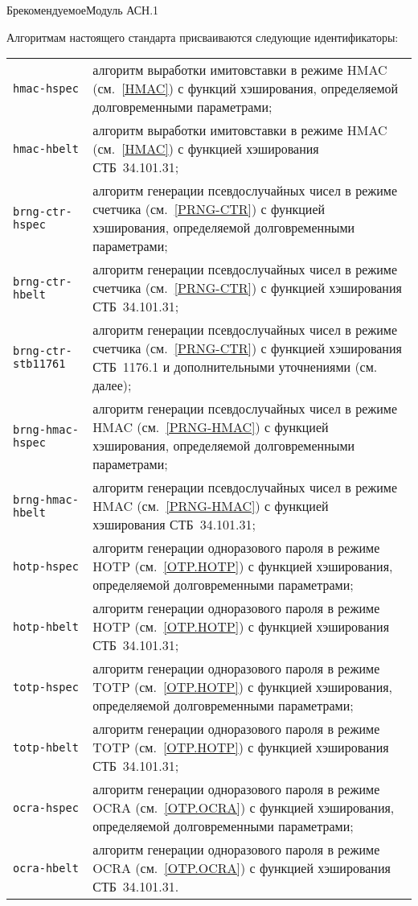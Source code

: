 \begin{appendix}{Б}{рекомендуемое}{Модуль АСН.1}
\label{ASN}


Алгоритмам настоящего стандарта присваиваются следующие идентификаторы:
\begin{center}
\begin{tabular}{p{4cm}p{12cm}}
\texttt{hmac-hspec} & 
алгоритм выработки имитовставки в режиме HMAC (см.~\ref{HMAC})
с функций хэширования, определяемой долговременными параметрами;\\ 
%
\texttt{hmac-hbelt} & 
алгоритм выработки имитовставки в режиме HMAC (см.~\ref{HMAC})
с функцией хэширования СТБ~34.101.31;\\ 
%
\texttt{brng-ctr-hspec} & 
алгоритм генерации псевдослучайных чисел в режиме счетчика 
(см.~\ref{PRNG-CTR})
с функцией хэширования, определяемой долговременными параметрами;\\ 
%
\texttt{brng-ctr-hbelt} & 
алгоритм генерации псевдослучайных чисел в режиме счетчика 
(см.~\ref{PRNG-CTR})
с функцией хэширования СТБ~34.101.31;\\ 
%
\texttt{brng-ctr-stb11761} & 
алгоритм генерации псевдослучайных чисел в режиме счетчика 
(см.~\ref{PRNG-CTR})
с функцией хэширования СТБ~1176.1 и дополнительными уточнениями (см. далее);\\ 
%
\texttt{brng-hmac-hspec} & 
алгоритм генерации псевдослучайных чисел в режиме HMAC 
(см.~\ref{PRNG-HMAC})
с функцией хэширования, определяемой долговременными параметрами;\\ 
%
\texttt{brng-hmac-hbelt} & 
алгоритм генерации псевдослучайных чисел в режиме HMAC 
(см.~\ref{PRNG-HMAC})
с функцией хэширования СТБ~34.101.31;\\
%
\texttt{hotp-hspec} & 
алгоритм генерации одноразового пароля в режиме HOTP
(см.~\ref{OTP.HOTP}) с функцией хэширования, 
определяемой долговременными параметрами;\\ 
%
\texttt{hotp-hbelt} & 
алгоритм генерации одноразового пароля в режиме HOTP
(см.~\ref{OTP.HOTP}) с функцией хэширования СТБ~34.101.31;\\ 
%
\texttt{totp-hspec} & 
алгоритм генерации одноразового пароля в режиме TOTP
(см.~\ref{OTP.HOTP}) с функцией хэширования, 
определяемой долговременными параметрами;\\ 
%
\texttt{totp-hbelt} & 
алгоритм генерации одноразового пароля в режиме TOTP
(см.~\ref{OTP.HOTP}) с функцией хэширования СТБ~34.101.31;\\ 
%
\texttt{ocra-hspec} & 
алгоритм генерации одноразового пароля в режиме OCRA
(см.~\ref{OTP.OCRA}) с функцией хэширования, 
определяемой долговременными параметрами;\\ 
%
\texttt{ocra-hbelt} & 
алгоритм генерации одноразового пароля в режиме OCRA
(см.~\ref{OTP.OCRA}) с функцией хэширования СТБ~34.101.31.
\end{tabular}
\end{center}


\end{appendix}
